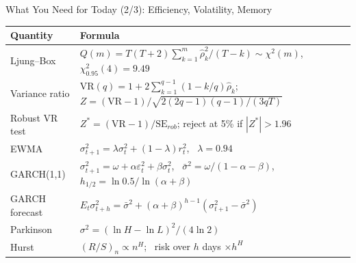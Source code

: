 \begin{frame}{What You Need for Today (2/3): Efficiency, Volatility, Memory}
\itemsize{\small}
{\renewcommand{\arraystretch}{1.3}\begin{center}
\footnotesize
\begin{tabular}{ll}
\toprule
\textbf{Quantity} & \textbf{Formula} \\
\midrule
Ljung--Box & $Q(m) = T(T+2)\sum_{k=1}^m \hat\rho_k^2/(T - k) \sim \chi^2(m)$, \ $\chi^2_{0.95}(4) = 9.49$ \\
Variance ratio & $\mathrm{VR}(q) = 1 + 2\sum_{k=1}^{q-1}(1 - k/q)\hat\rho_k$; \ $Z = (\mathrm{VR} - 1)/\sqrt{2(2q-1)(q-1)/(3qT)}$ \\
Robust VR test & $Z^* = (\mathrm{VR} - 1)/\mathrm{SE}_{rob}$; reject at 5\% if $|Z^*| > 1.96$ \\
EWMA & $\sigma_{t+1}^2 = \lambda\sigma_t^2 + (1 - \lambda)r_t^2$, \ $\lambda = 0.94$ \\
GARCH(1,1) & $\sigma_{t+1}^2 = \omega + \alpha\varepsilon_t^2 + \beta\sigma_t^2$, \ $\bar\sigma^2 = \omega/(1 - \alpha - \beta)$, \ $h_{1/2} = \ln 0.5/\ln(\alpha + \beta)$ \\
GARCH forecast & $E_t\sigma_{t+h}^2 = \bar\sigma^2 + (\alpha + \beta)^{h-1}(\sigma_{t+1}^2 - \bar\sigma^2)$ \\
Parkinson & $\sigma^2 = (\ln H - \ln L)^2/(4\ln 2)$ \\
Hurst & $(R/S)_n \propto n^H$; \ risk over $h$ days $\times h^H$ \\
\bottomrule
\end{tabular}
\end{center}
}
\end{frame}

